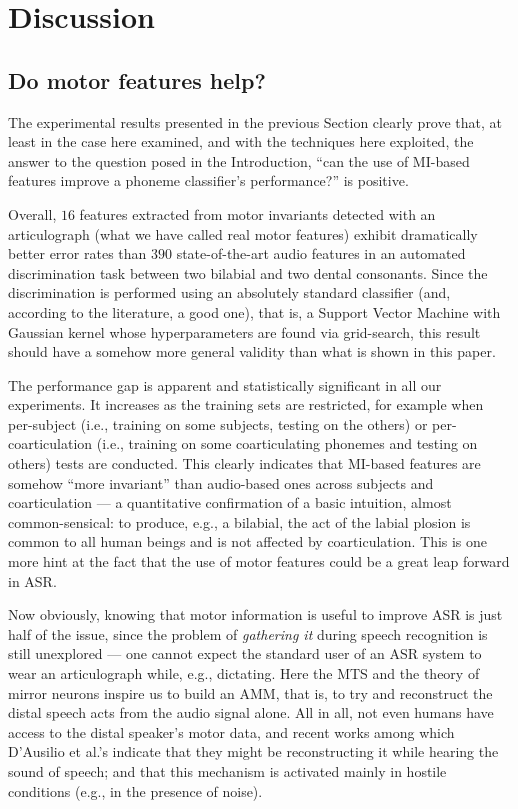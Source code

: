 \section{Discussion}
\label{sec:disc}

\subsection{Do motor features help?}

The experimental results presented in the previous Section clearly prove that,
at least in the case here examined, and with the techniques here exploited,
the answer to the question posed in the Introduction, ``can the use of MI-based
features improve a phoneme classifier's performance?'' is positive.

Overall, $16$ features extracted from motor invariants detected with an articulograph
(what we have called real motor features) exhibit dramatically better error rates
than $390$ state-of-the-art audio features in an automated discrimination task between
two bilabial and two dental consonants. Since the discrimination is performed using an
absolutely standard classifier (and, according to the literature, a good one), that is,
a Support Vector Machine with Gaussian kernel whose hyperparameters are found via
grid-search, this result should have a somehow more general validity than what is shown
in this paper.

The performance gap is apparent and statistically significant in all our experiments.
It increases as the training sets are restricted, for example
when per-subject (i.e., training on some subjects, testing on the others) or
per-coarticulation (i.e., training on some coarticulating phonemes and testing on
others) tests are conducted. This clearly indicates that MI-based features are
somehow ``more invariant'' than audio-based ones across subjects and
coarticulation --- a quantitative confirmation of a basic
intuition, almost common-sensical: to produce, e.g., a bilabial, the act of
the labial plosion is common to all human beings and is not affected by
coarticulation. This is one more hint at the fact that the use of motor features
could be a great leap forward in ASR.

Now obviously, knowing that motor information is useful to improve ASR is just half
of the issue, since the problem of \emph{gathering it} during speech recognition is
still unexplored --- one cannot expect the standard user of an ASR system to wear
an articulograph while, e.g., dictating. Here the MTS and the theory of mirror neurons
inspire us to build an AMM, that is, to try and reconstruct the distal speech acts from
the audio signal alone. All in all, not even humans have access to the distal speaker's
motor data, and recent works among which D'Ausilio et al.'s \cite{dausilio} indicate
that they might be reconstructing it while hearing the sound of speech; and that this
mechanism is activated mainly in hostile conditions (e.g., in the presence of noise).

